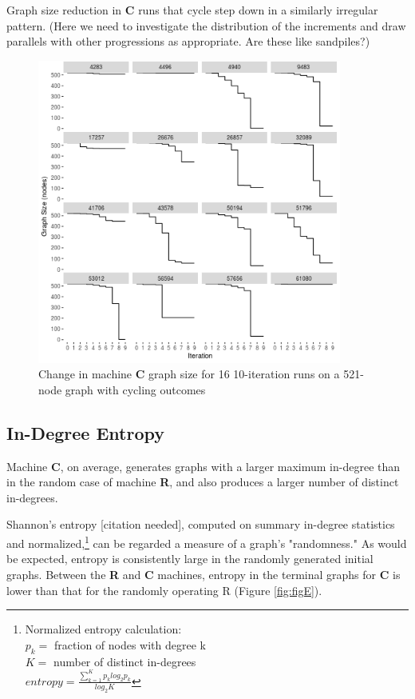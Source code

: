 \documentclass{tufte-handout}
\begin{document}
{Graph size reduction in \textbf{C} runs that cycle step down in a similarly
irregular pattern. (Here we need to investigate the distribution of the
increments and draw parallels with other progressions as appropriate. Are
these like sandpiles?)

\begin{figure}[htb]
\includegraphics[height=10cm]{ccyc_stepdown.png}
\caption{Change in machine \textbf{C} graph size for 16 10-iteration runs
on a 521-node graph with cycling outcomes}
\label{fig:CCyclingDynamics}
\end{figure}

\clearpage

\subsection{In-Degree Entropy}

Machine \textbf{C}, on average, generates graphs with a larger 
maximum in-degree than in the random case of machine \textbf{R}, and also produces a
larger number of distinct in-degrees.

Shannon's entropy [citation needed], computed on summary in-degree statistics and
normalized,\footnote{
Normalized entropy calculation: \\
\vspace{2mm}
$p_{k}=$ fraction of nodes with degree k \\
$K=$ number of distinct in-degrees \\
\vspace{2mm}
$entropy = \frac{\sum_{k=1}^{K} p_{k} log_{2}p_{k}} {log_{2}K}$}
can be regarded a measure of a graph's "randomness."
As would be expected, entropy is consistently large in the randomly generated
initial graphs. Between the \textbf{R} and \textbf{C} machines, entropy in the terminal
graphs for \textbf{C} is lower than that for the randomly operating R (Figure \ref{fig:figE}).

}
\end{document}
